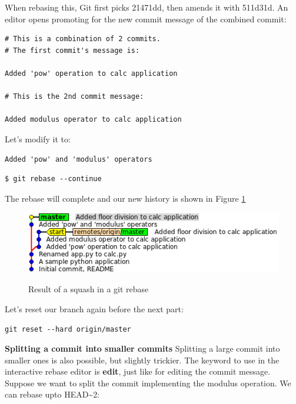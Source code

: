 \documentclass{../../common/tufte-latex/tufte-handout}
\begin{document}
When rebasing this, Git first picks 21471dd, then amends it with 511d31d.
An editor opens promoting for the new commit message of the combined commit:
\begin{lstlisting}[style=BashInputStyle]
# This is a combination of 2 commits.
# The first commit's message is:

Added 'pow' operation to calc application

# This is the 2nd commit message:

Added modulus operator to calc application
\end{lstlisting}

Let's modify it to:

\begin{lstlisting}[style=BashInputStyle]
Added 'pow' and 'modulus' operators
\end{lstlisting}

\begin{lstlisting}[style=BashInputStyle]
  $ git rebase --continue
\end{lstlisting}

The rebase will complete and our new history is shown in Figure \ref{fig:gitrebase-squash}

\begin{figure}%
  \centering
  \includegraphics[width=0.75\linewidth]{gitrebase-squash.png}
  \label{fig:gitrebase-squash}
  \caption{Result of a squash in a git rebase}
\end{figure}

Let's reset our branch again before the next part:

\begin{lstlisting}[style=BashInputStyle]
  git reset --hard origin/master
\end{lstlisting}

\noindent \textbf{Splitting a commit into smaller commits}
Splitting a large commit into smaller ones is also possible, but slightly trickier.
The keyword to use in the interactive rebase editor is \textbf{edit}, just like for editing the commit message.
Suppose we want to split the commit implementing the modulus operation.
We can rebase upto HEAD\textasciitilde2:
\end{document}
